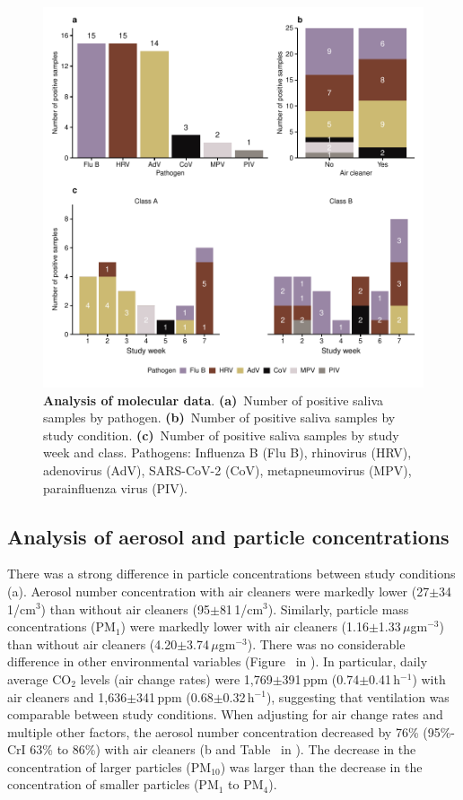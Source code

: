 \documentclass[fleqn,11pt]{wlscirep}
\begin{document}
\begin{figure}[!htpb]
    \centering
    \includegraphics{../../results/mol-data/descriptives.pdf}
    \caption{\textbf{Analysis of molecular data}. \textbf{(a)}~Number of positive saliva samples by pathogen. \textbf{(b)}~Number of positive saliva samples by study condition. \textbf{(c)}~Number of positive saliva samples by study week and class. Pathogens: Influenza B (Flu B), rhinovirus (HRV), adenovirus (AdV), SARS-CoV-2 (CoV), metapneumovirus (MPV), parainfluenza virus (PIV).}
    \label{fig:molecular-descriptives}
\end{figure}

\subsection{Analysis of aerosol and particle concentrations}

There was a strong difference in particle concentrations between study conditions (a). Aerosol number concentration with air cleaners were markedly lower (27$\pm$34\,1/cm$^3$) than without air cleaners (95$\pm$81\,1/cm$^3$). Similarly, particle mass concentrations (\eg PM$_1$) were markedly lower with air cleaners (1.16$\pm$1.33\,$\mu$gm$^{-3}$) than without air cleaners (4.20$\pm$3.74\,$\mu$gm$^{-3}$). There was no considerable difference in other environmental variables (Figure~ in \supp). In particular, daily average CO$_2$ levels (air change rates) were 1,769$\pm$391\,ppm (0.74$\pm$0.41\,h$^{-1}$) with air cleaners and 1,636$\pm$341\,ppm (0.68$\pm$0.32\,h$^{-1}$), suggesting that ventilation was comparable between study conditions. When adjusting for air change rates and multiple other factors, the aerosol number concentration decreased by 76\% (95\%-CrI 63\% to 86\%) with air cleaners (b and Table~ in \supp). The decrease in the concentration of larger particles (PM$_{10}$) was larger than the decrease in the concentration of smaller particles (PM$_1$ to PM$_{4}$). 
\end{document}
